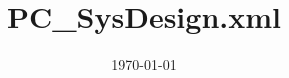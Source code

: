 \documentclass[11pt,a4paper]{article}
\begin{document}
\title{PC\_SysDesign.xml}
\date{\today}
\maketitle


\end{document}
